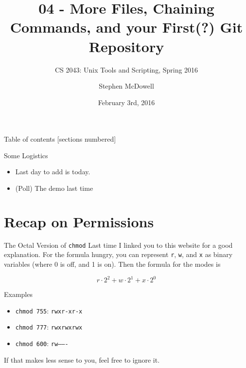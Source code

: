 \documentclass[11pt]{beamer}
\title{04 \-- More Files, Chaining Commands, and your First(?) Git Repository}
\subtitle{CS 2043: Unix Tools and Scripting, Spring 2016 \cite{prevSemesters}}
\date{February 3rd, 2016}
\author{Stephen McDowell}
\institute{Cornell University}
\begin{document}
\maketitle

\begin{frame}{Table of contents}
  [sections numbered]
  \tableofcontents[hideallsubsections]
\end{frame}

\begin{frame}{Some Logistics}
  \begin{itemize}[<+- | alert@+>]
    \item Last day to add is today.
    \item (Poll) The demo last time
  \end{itemize}
\end{frame}

%
\section{Recap on Permissions}
\label{sec:recap_on_permissions}

\begin{frame}[fragile]{The Octal Version of \texttt{chmod}}
  Last time I linked you to this\cite{chmod} website for a good explanation.  For the formula hungry, you can
  represent \texttt{r}, \texttt{w}, and \texttt{x} as binary variables (where 0 is off, and 1 is on).  Then
  the formula for the modes is

  $$
    r\cdot2^2 + w\cdot2^1 + x\cdot2^0
  $$

  \begin{block}{Examples}
    \begin{itemize}
      \item \texttt{chmod 755}: \texttt{rwxr-xr-x}
      \item \texttt{chmod 777}: \texttt{rwxrwxrwx}
      \item \texttt{chmod 600}: \texttt{rw-------}
    \end{itemize}
  \end{block}

  If that makes less sense to you, feel free to ignore it.
\end{frame}
\end{document}
